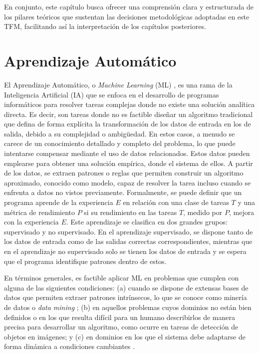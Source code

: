 En conjunto, este capítulo busca ofrecer una comprensión clara y estructurada de los pilares teóricos que sustentan las decisiones metodológicas adoptadas en este TFM, facilitando así la interpretación de los capítulos posteriores.

\section{Aprendizaje Automático}
\label{section2:ML}
El Aprendizaje Automático, o \textit{Machine Learning} (ML) \cite{abu-mostafa_learning_2012, bishop_pattern_2019, murphy_probabilistic_2022, murphy_probabilistic_2023, 6284961}, es una rama de la Inteligencia Artificial (IA) que se enfoca en el desarrollo de programas informáticos para resolver tareas complejas donde no existe una solución analítica directa. Es decir, son tareas donde no es factible diseñar un algoritmo tradicional que defina de forma explícita la transformación de los datos de entrada en los de salida, debido a su complejidad o ambigüedad. En estos casos, a menudo se carece de un conocimiento detallado y completo del problema, lo que puede intentarse compensar mediante el uso de datos relacionados. Estos datos pueden emplearse para obtener una solución empírica, donde el sistema  de ellos. A partir de los datos, se extraen patrones o reglas que permiten construir un algoritmo aproximado, conocido como modelo, capaz de resolver la tarea incluso cuando se enfrenta a datos no vistos previamente. Formalmente, se puede definir que un programa aprende de la experiencia $E$ en relación con una clase de tareas $T$ y una métrica de rendimiento $P$ si su rendimiento en las tareas $T$, medido por $P$, mejora con la experiencia $E$. Este aprendizaje se clasifica en dos grandes grupos: supervisado y no supervisado. En el aprendizaje supervisado, se dispone tanto de los datos de entrada como de las salidas correctas correspondientes, mientras que en el aprendizaje no supervisado solo se tienen los datos de entrada y se espera que el programa identifique patrones dentro de estos.

En términos generales, es factible aplicar ML en problemas que cumplen con alguna de las siguientes condiciones: (a) cuando se dispone de extensas bases de datos que permiten extraer patrones intrínsecos, lo que se conoce como minería de datos o \textit{data mining} \cite{alma991006986149704990}; (b) en aquellos problemas cuyos dominios no están bien definidos o en los que resulta difícil para un humano describirlos de manera precisa para desarrollar un algoritmo, como ocurre en tareas de detección de objetos en imágenes; y (c) en dominios en los que el sistema debe adaptarse de forma dinámica a condiciones cambiantes \cite{murphy_probabilistic_2023}.

